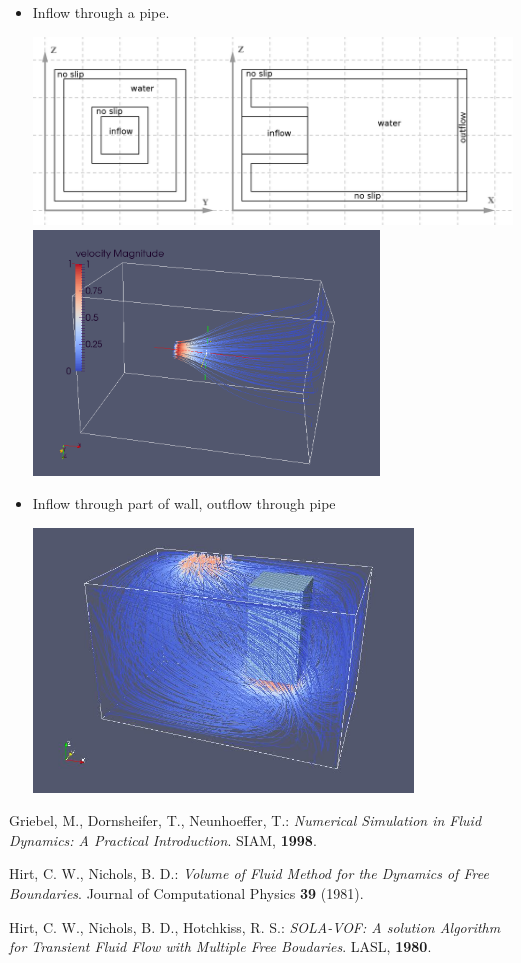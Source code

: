 \documentclass[a4paper, 12pt]{article}
\begin{document}
\begin{itemize}
\item Inflow through a pipe.\\
\begin{center}
\includegraphics[height=5cm]{pipeinflow.png}
\includegraphics[height=6.5cm]{pipeinflw.png}
\end{center}

\item Inflow through part of wall, outflow through pipe
\begin{center}
\includegraphics[height=7cm]{inoutpipe.jpg}
\end{center}
\end{itemize}


\begin{thebibliography}{99}
Griebel, M., Dornsheifer, T., Neunhoeffer, T.: \emph{Numerical Simulation in
Fluid Dynamics: A Practical Introduction}. SIAM, {\bf 1998}.

Hirt, C. W., Nichols, B. D.: \emph{Volume of Fluid Method for the Dynamics of Free Boundaries}. Journal of Computational Physics {\bf 39} (1981).

Hirt, C. W., Nichols, B. D., Hotchkiss, R. S.: \emph{SOLA-VOF: A solution Algorithm for Transient Fluid Flow with Multiple Free Boudaries}. LASL, {\bf 1980}.
\end{thebibliography}
\end{document}
